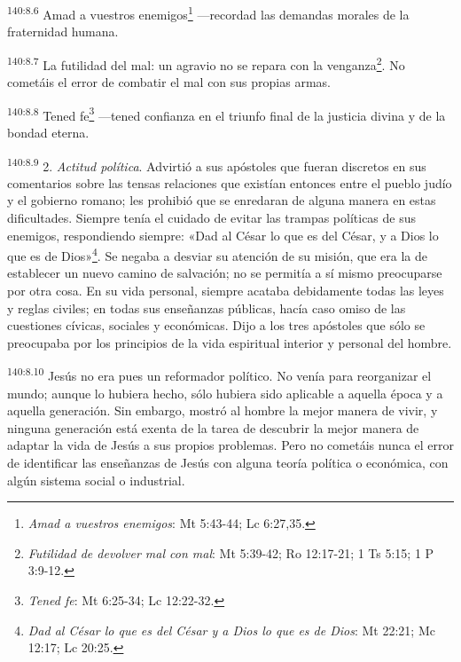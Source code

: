 \par
\textsuperscript{140:8.6} Amad a vuestros enemigos\footnote{\textit{Amad a vuestros enemigos}: Mt 5:43-44; Lc 6:27,35.} ---recordad las demandas morales de la fraternidad humana.

\par
\textsuperscript{140:8.7} La futilidad del mal: un agravio no se repara con la venganza\footnote{\textit{Futilidad de devolver mal con mal}: Mt 5:39-42; Ro 12:17-21; 1 Ts 5:15; 1 P 3:9-12.}. No cometáis el error de combatir el mal con sus propias armas.

\par
\textsuperscript{140:8.8} Tened fe\footnote{\textit{Tened fe}: Mt 6:25-34; Lc 12:22-32.} ---tened confianza en el triunfo final de la justicia divina y de la bondad eterna.

\par
\textsuperscript{140:8.9} 2. \textit{Actitud política}. Advirtió a sus apóstoles que fueran discretos en sus comentarios sobre las tensas relaciones que existían entonces entre el pueblo judío y el gobierno romano; les prohibió que se enredaran de alguna manera en estas dificultades. Siempre tenía el cuidado de evitar las trampas políticas de sus enemigos, respondiendo siempre: «Dad al César lo que es del César, y a Dios lo que es de Dios»\footnote{\textit{Dad al César lo que es del César y a Dios lo que es de Dios}: Mt 22:21; Mc 12:17; Lc 20:25.}. Se negaba a desviar su atención de su misión, que era la de establecer un nuevo camino de salvación; no se permitía a sí mismo preocuparse por otra cosa. En su vida personal, siempre acataba debidamente todas las leyes y reglas civiles; en todas sus enseñanzas públicas, hacía caso omiso de las cuestiones cívicas, sociales y económicas. Dijo a los tres apóstoles que sólo se preocupaba por los principios de la vida espiritual interior y personal del hombre.

\par
\textsuperscript{140:8.10} Jesús no era pues un reformador político. No venía para reorganizar el mundo; aunque lo hubiera hecho, sólo hubiera sido aplicable a aquella época y a aquella generación. Sin embargo, mostró al hombre la mejor manera de vivir, y ninguna generación está exenta de la tarea de descubrir la mejor manera de adaptar la vida de Jesús a sus propios problemas. Pero no cometáis nunca el error de identificar las enseñanzas de Jesús con alguna teoría política o económica, con algún sistema social o industrial.

